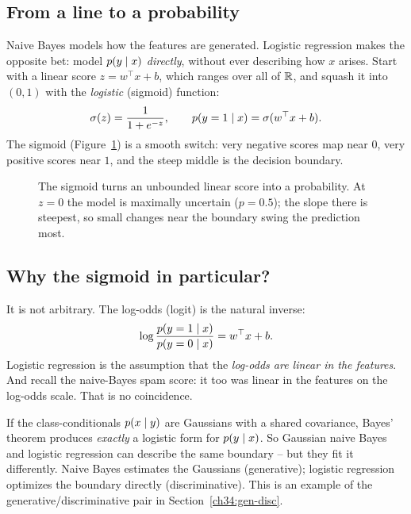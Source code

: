 \subsection{From a line to a probability}

Naive Bayes models how the features are generated. Logistic regression makes the
opposite bet: model $p(y\mid x)$ \emph{directly}, without ever describing how
$x$ arises. Start with a linear score $z = w^\top x + b$, which ranges over all of
$\mathbb{R}$, and squash it into $(0,1)$ with the \emph{logistic} (sigmoid) function:
\[
  \sigma(z) = \frac{1}{1+e^{-z}}, \qquad
  p(y=1\mid x) = \sigma(w^\top x + b).
\]
The sigmoid (Figure~\ref{ch34:fig-sigmoid}) is a smooth switch: very negative
scores map near $0$, very positive scores near $1$, and the steep middle is the
decision boundary.

\begin{figure}[H]
\centering
{}
\caption{The sigmoid turns an unbounded linear score into a probability. At
$z=0$ the model is maximally uncertain ($p=0.5$); the slope there is steepest,
so small changes near the boundary swing the prediction most.}
\label{ch34:fig-sigmoid}
\end{figure}

\subsection{Why the sigmoid in particular?}

It is not arbitrary. The log-odds (logit) is the natural inverse:
\[
  \log\frac{p(y=1\mid x)}{p(y=0\mid x)} = w^\top x + b.
\]
Logistic regression is the assumption that the \emph{log-odds are linear in the
features}. And recall the naive-Bayes spam score: it too was linear in the
features on the log-odds scale. That is no coincidence.

\begin{connectionbox}
If the class-conditionals $p(x\mid y)$ are Gaussians with a shared covariance,
Bayes' theorem produces \emph{exactly} a logistic form for $p(y\mid x)$. So
Gaussian naive Bayes and logistic regression can describe the same boundary --
but they fit it differently. Naive Bayes estimates the Gaussians (generative);
logistic regression optimizes the boundary directly (discriminative). This is an example of the generative/discriminative pair in Section~\ref{ch34:gen-disc}.
\end{connectionbox}

